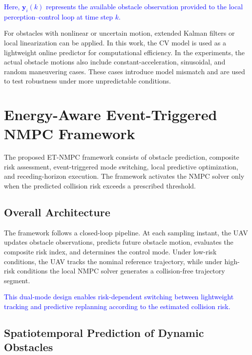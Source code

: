 \documentclass[lettersize,journal]{IEEEtran}
\newcommand{\vect}[1]{\boldsymbol{#1}}
\begin{document}
\textcolor{blue}{Here, $\vect{y}_i(k)$ represents the available obstacle observation provided to the local perception--control loop at time step $k$.}

For obstacles with nonlinear or uncertain motion, extended Kalman filters or local linearization can be applied. In this work, the CV model is used as a lightweight online predictor for computational efficiency. In the experiments, the actual obstacle motions also include constant-acceleration, sinusoidal, and random maneuvering cases. These cases introduce model mismatch and are used to test robustness under more unpredictable conditions.

\section{Energy-Aware Event-Triggered NMPC Framework} 

The proposed ET-NMPC framework consists of obstacle prediction, composite risk assessment, event-triggered mode switching, local predictive optimization, and receding-horizon execution. The framework activates the NMPC solver only when the predicted collision risk exceeds a prescribed threshold.

\subsection{Overall Architecture}

The framework follows a closed-loop pipeline. At each sampling instant, the UAV updates obstacle observations, predicts future obstacle motion, evaluates the composite risk index, and determines the control mode. Under low-risk conditions, the UAV tracks the nominal reference trajectory, while under high-risk conditions the local NMPC solver generates a collision-free trajectory segment.

\textcolor{blue}{This dual-mode design enables risk-dependent switching between lightweight tracking and predictive replanning according to the estimated collision risk.}

\subsection{Spatiotemporal Prediction of Dynamic Obstacles}
\end{document}
